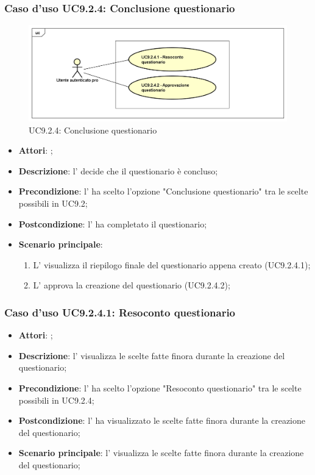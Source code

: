 		\subsubsection{Caso d'uso UC9.2.4: Conclusione questionario}
		\label{UC9.2.4}
		\begin{figure}[h]
			\centering
			\includegraphics[scale=0.5,keepaspectratio]{UML/UC9_2_4.png}
			\caption{UC9.2.4: Conclusione questionario}
		\end{figure}
		\FloatBarrier
		\begin{itemize}
			\item \textbf{Attori}: \uaupro{}; 
			\item \textbf{Descrizione}: l'\uaupro{} decide che il questionario è concluso;
			\item \textbf{Precondizione}: l'\uaupro{} ha scelto l'opzione "Conclusione questionario" tra le scelte possibili in UC9.2;
			\item \textbf{Postcondizione}: l'\uaupro{} ha completato il questionario;
			\item \textbf{Scenario principale}: 
				\begin{enumerate}
					\item L'\uaupro{} visualizza il riepilogo finale del questionario appena creato (UC9.2.4.1); 
					\item L'\uaupro{} approva la creazione del questionario (UC9.2.4.2); 
				\end{enumerate}
		\end{itemize}
				
			\subsubsection{Caso d'uso UC9.2.4.1: Resoconto questionario}
			\label{UC9.2.4.1}
			\begin{itemize}
				\item \textbf{Attori}: \uaupro{};
				\item \textbf{Descrizione}: l'\uaupro{} visualizza le scelte fatte finora durante la creazione del questionario;
				\item \textbf{Precondizione}: l'\uaupro{} ha scelto l'opzione "Resoconto questionario" tra le scelte possibili in UC9.2.4;
				\item \textbf{Postcondizione}: l'\uaupro{} ha visualizzato le scelte fatte finora durante la creazione del questionario;
				\item \textbf{Scenario principale}: l'\uaupro{} visualizza le scelte fatte finora durante la creazione del questionario;
			\end{itemize}
			
